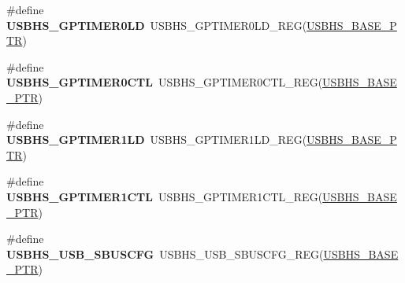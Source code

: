 \begin{DoxyCompactItemize}
\item 
\hypertarget{group___u_s_b_h_s___register___accessor___macros_ga6b8c0f873e02e61f780bb89327f3e417}{}\#define {\bfseries U\+S\+B\+H\+S\+\_\+\+G\+P\+T\+I\+M\+E\+R0\+L\+D}~U\+S\+B\+H\+S\+\_\+\+G\+P\+T\+I\+M\+E\+R0\+L\+D\+\_\+\+R\+E\+G(\hyperlink{group___u_s_b_h_s___peripheral_gaa2bc10b8cd66f96acd39e15b3a581306}{U\+S\+B\+H\+S\+\_\+\+B\+A\+S\+E\+\_\+\+P\+T\+R})\label{group___u_s_b_h_s___register___accessor___macros_ga6b8c0f873e02e61f780bb89327f3e417}

\item 
\hypertarget{group___u_s_b_h_s___register___accessor___macros_ga4f4a447a81847af004aebac9db262a9f}{}\#define {\bfseries U\+S\+B\+H\+S\+\_\+\+G\+P\+T\+I\+M\+E\+R0\+C\+T\+L}~U\+S\+B\+H\+S\+\_\+\+G\+P\+T\+I\+M\+E\+R0\+C\+T\+L\+\_\+\+R\+E\+G(\hyperlink{group___u_s_b_h_s___peripheral_gaa2bc10b8cd66f96acd39e15b3a581306}{U\+S\+B\+H\+S\+\_\+\+B\+A\+S\+E\+\_\+\+P\+T\+R})\label{group___u_s_b_h_s___register___accessor___macros_ga4f4a447a81847af004aebac9db262a9f}

\item 
\hypertarget{group___u_s_b_h_s___register___accessor___macros_gab8e0fac77daefac22f6a15828e46befe}{}\#define {\bfseries U\+S\+B\+H\+S\+\_\+\+G\+P\+T\+I\+M\+E\+R1\+L\+D}~U\+S\+B\+H\+S\+\_\+\+G\+P\+T\+I\+M\+E\+R1\+L\+D\+\_\+\+R\+E\+G(\hyperlink{group___u_s_b_h_s___peripheral_gaa2bc10b8cd66f96acd39e15b3a581306}{U\+S\+B\+H\+S\+\_\+\+B\+A\+S\+E\+\_\+\+P\+T\+R})\label{group___u_s_b_h_s___register___accessor___macros_gab8e0fac77daefac22f6a15828e46befe}

\item 
\hypertarget{group___u_s_b_h_s___register___accessor___macros_gae6b64991e4f0c087750317b33471d955}{}\#define {\bfseries U\+S\+B\+H\+S\+\_\+\+G\+P\+T\+I\+M\+E\+R1\+C\+T\+L}~U\+S\+B\+H\+S\+\_\+\+G\+P\+T\+I\+M\+E\+R1\+C\+T\+L\+\_\+\+R\+E\+G(\hyperlink{group___u_s_b_h_s___peripheral_gaa2bc10b8cd66f96acd39e15b3a581306}{U\+S\+B\+H\+S\+\_\+\+B\+A\+S\+E\+\_\+\+P\+T\+R})\label{group___u_s_b_h_s___register___accessor___macros_gae6b64991e4f0c087750317b33471d955}

\item 
\hypertarget{group___u_s_b_h_s___register___accessor___macros_ga2854bd22c8efe53c487e7cdb55e7a23f}{}\#define {\bfseries U\+S\+B\+H\+S\+\_\+\+U\+S\+B\+\_\+\+S\+B\+U\+S\+C\+F\+G}~U\+S\+B\+H\+S\+\_\+\+U\+S\+B\+\_\+\+S\+B\+U\+S\+C\+F\+G\+\_\+\+R\+E\+G(\hyperlink{group___u_s_b_h_s___peripheral_gaa2bc10b8cd66f96acd39e15b3a581306}{U\+S\+B\+H\+S\+\_\+\+B\+A\+S\+E\+\_\+\+P\+T\+R})\label{group___u_s_b_h_s___register___accessor___macros_ga2854bd22c8efe53c487e7cdb55e7a23f}


\end{DoxyCompactItemize}
